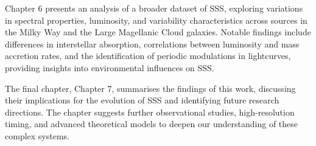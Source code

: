     Chapter 6 presents an analysis of a broader dataset of SSS, exploring variations in spectral properties, luminosity, and variability characteristics across sources in the Milky Way and the Large Magellanic Cloud galaxies. Notable findings include differences in interstellar absorption, correlations between luminosity and mass accretion rates, and the identification of periodic modulations in lightcurves, providing insights into environmental influences on SSS.
    
    The final chapter, Chapter 7, summarises the findings of this work, discussing their implications for the evolution of SSS and identifying future research directions. The chapter suggests further observational studies, high-resolution timing, and advanced theoretical models to deepen our understanding of these complex systems.